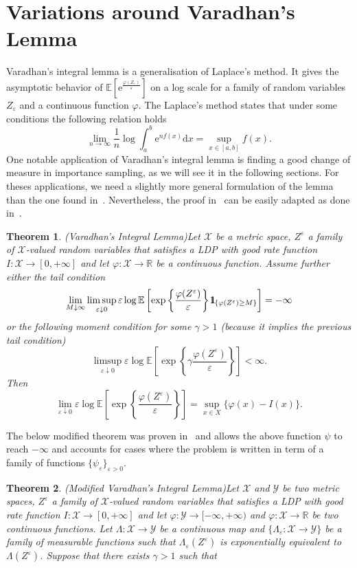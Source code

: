 \documentclass{amsart}[11pt]
\numberwithin{equation}{section}
\newtheorem{theorem}{Theorem}%
\numberwithin{theorem}{subsection}
\numberwithin{proposition}{subsection}
\numberwithin{definition}{subsection}
\numberwithin{lemma}{subsection}
\numberwithin{assumption}{subsection}
\newcommand{\Xx}{\mathcal{X}}
\newcommand{\Yy}{\mathcal{Y}}
\newcommand{\RR}{\mathbb{R}}
\newcommand{\R}{\RR}
\newcommand{\EE}{\mathbb{E}}
\newcommand{\D}{\mathrm{d}}
\newcommand{\E}{\mathrm{e}}
\newcommand{\eps}{\varepsilon}
\newcommand{\ind}{1\hspace{-2.1mm}{1}} %
\begin{document}
\section{Variations around Varadhan's Lemma}\label{thm:varadhan}
\small{
Varadhan's integral lemma is a generalisation of Laplace's method. It gives the asymptotic behavior of $\EE[\E^{\frac{\varphi(Z_{\eps})}{\eps}}]$ on a log scale for a family of random variables $Z_{\eps}$ and a continuous function $\varphi$. The Laplace's method states that under some conditions the following relation holds
$$\lim_{n\rightarrow\infty}\frac{1}{n}\log \int_a^b \E^{n f(x)} \D x = \sup\limits_{x\in[a,b]}f(x).$$
One notable application of Varadhan's integral lemma is finding a good change of measure in importance sampling, as we will see it in the following sections. For theses applications, we need a slightly more general formulation of the lemma than the one found in~\cite{Dembo2010}. Nevertheless, the proof in~\cite{Dembo2010} can be easily adapted as done in~\cite{Robertson2010}.
\begin{theorem} (Varadhan's Integral Lemma)\label{thm:Varadhan}
Let $\Xx$ be a metric space, $Z^{\eps}$ a family of $\Xx$-valued random variables that satisfies a LDP with good rate function $I:\Xx\rightarrow [0,+\infty]$ and let $\varphi : \Xx \rightarrow \R$ be a continuous function. Assume further either the tail condition
$$
\lim\limits_{M\downarrow \infty} \limsup_{\eps \downarrow 0}
\eps\log \EE\left[\exp\left\{\frac{\varphi(Z^{\eps})}{\eps}\right\}\ind_{ \{ \varphi(Z^{\eps}) \geq M\}}\right]  = - \infty
$$
or the following moment condition for some $\gamma > 1$ (because it implies the previous tail condition)
$$
\limsup\limits_{\eps \downarrow 0}
\eps\log \EE\left[\exp\left\{\gamma \frac{\varphi(Z^{\eps})}{\eps}\right\}\right]
< \infty .
$$
Then
$$
\lim_{\eps \downarrow 0}
\eps\log \EE\left[\exp\left\{\frac{\varphi(Z^{\eps})}{\eps}\right\}\right]
= \sup\limits_{x \in X} \{\varphi(x) - I(x) \}.
$$
\end{theorem}
The below modified theorem was proven in~\cite{Robertson2010} and allows the above function $\psi$ to reach $- \infty$ and accounts for cases where the problem is written in term of a family of functions $\{\psi_{\eps}\}_{\eps>0}$.
\begin{theorem}(Modified Varadhan's Integral Lemma)\label{thm:varadhan_modified}
Let $\Xx$ and $\Yy$ be two metric spaces, $Z^{\eps}$ a family of $\Xx$-valued random variables that satisfies a LDP with good rate function $I:\Xx\rightarrow [0,+\infty]$ and let $\varphi : \Yy \rightarrow [-\infty,+\infty)$ and $\varphi : \Xx \rightarrow \R$  be two continuous functions. Let $\Lambda : \Xx \rightarrow \Yy$ be a continuous map and $\{\Lambda_{\eps} : \Xx \rightarrow \Yy\}$ be a family of measurable functions such that $\Lambda_{\eps}(Z^{\eps})$ is exponentially equivalent to $\Lambda(Z^{\eps})$. Suppose that there exists $\gamma > 1$ such that

\end{theorem}}
\end{document}
